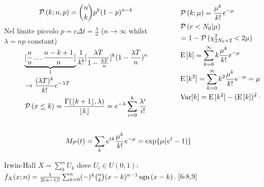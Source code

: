 \documentclass[asd-beamer.tex]{subfiles}%
\begin{document}
\begin{frame}{}
\begin{columns}[T]
	\begin{column}{0.5\textwidth}
\[\operatorname{\mathcal{P}}{(k;n,p)}=\binom{n}{k}p^k(1-p)^{n-k}\]
Nel limite piccolo $p=c\Delta t=\frac{\lambda}{n}$ ($n\to\infty$ whilst $\lambda=np$ constant)
\begin{align*}
&\underbrace{[\frac{n}{n}\ldots\frac{n-k+1}{n}]}_{1}\frac{1}{k!}[\frac{\lambda T}{1-\frac{\lambda T}{n}}]^k(1-\frac{\lambda T}{n})^n\\
&\to\frac{(\lambda T)^k}{k!}e^{-\lambda T}\\
&\operatorname{\mathcal{P}}{(x\leq k)}=\frac{\Gamma(\lfloor k+1\rfloor,\lambda)}{\lfloor k\rfloor}=e^{-\lambda}\sum_{i=0}^k\frac{\lambda^i}{i!}
\end{align*}
	\end{column}
	\begin{column}{0.5\textwidth}
		\begin{align*}
&\operatorname{\mathcal{P}}{(k;\mu)}=\frac{\mu^k}{k!}e^{-\mu}\\
&\operatorname{\mathcal{P}}{(r<N_0|\mu)}\\
&=1-\operatorname{\mathcal{P}}{(\chi^2_{2N_0+2}<2\mu)}\\
&\operatorname{E}{[k]}=\sum_{k=0}^{\infty}k\frac{\mu^k}{k!}e^{-\mu}\\
&\operatorname{E}{[k^2]}=\sum_{k=0}^{\infty}k^2\frac{\mu^k}{k!}e^{-\mu}=\mu^2+\mu\\
&\operatorname{Var}[k]=\operatorname{E}{[k^2]}-(\operatorname{E}{[k]})^2=\mu
\end{align*}
	\end{column}
\end{columns}
\begin{align*}
&M_P(t)=\sum_ke^{tk}\frac{\mu^k}{k!}e^{-\mu}=\text{exp}\{\mu(e^{t}-1)\}
\end{align*}
\end{frame}

\begin{frame}{Irwin-Hall}
$X=\sum_k^nU_k$ dove $U_i\in U(0,1)$: $f_X(x;n)=\frac{1}{2(n-1)!}\sum_{k=0}^n(-)^k\binom{n}{k}(x-k)^{n-1}\operatorname{sgn}{(x-k)}$.
[6-8,9]
    
\end{frame}
\end{document}
